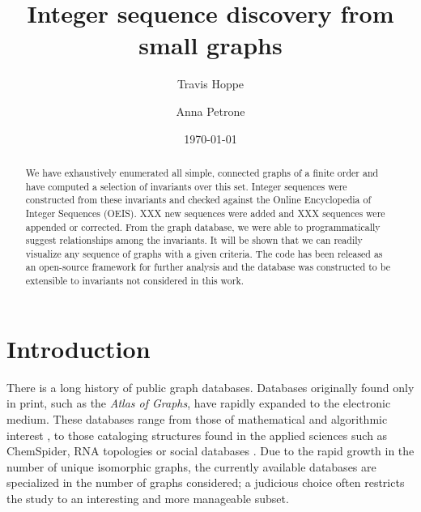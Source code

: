 \documentclass[12pt]{article}
\newcommand{\OEISedits}{XXX\xspace}
\newcommand{\OEISprimary}{XXX\xspace}
\begin{document}
\title{Integer sequence discovery from small graphs}
\author[1]{Travis Hoppe}
\author[2]{Anna Petrone}

\date{\today}
\maketitle

\begin{abstract}
We have exhaustively enumerated all simple, connected graphs of a finite order and have computed a selection of invariants over this set.
Integer sequences were constructed from these invariants and checked against the Online Encyclopedia of Integer Sequences (OEIS).
\OEISprimary new sequences were added and \OEISedits sequences were appended or corrected.
From the graph database, we were able to programmatically suggest relationships among the invariants.
It will be shown that we can readily visualize any sequence of graphs with a given criteria. 
The code has been released as an open-source framework for further analysis and the database was constructed to be extensible to invariants not considered in this work.
\end{abstract}

\section{Introduction}

There is a long history of public graph databases. 
Databases originally found only in print, such as the \textit{Atlas of Graphs}\cite{read1998atlas}, have rapidly expanded to the electronic medium.
These databases range from those of mathematical and algorithmic interest \cite{de2003large, brinkmann2013house}, to those cataloging structures found in the applied sciences such as ChemSpider\cite{pence2010chemspider}, RNA topologies\cite{gan2004rag, laing2013predicting} or social databases \cite{mcauley2014circles,brandes2009wikipedia,oestreicher2006amazon}.
Due to the rapid growth in the number of unique isomorphic graphs, the currently available databases are specialized in the number of graphs considered; 
a judicious choice often restricts the study to an interesting and more manageable subset.
\end{document}
